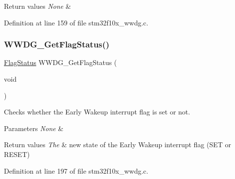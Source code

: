 \begin{DoxyRetVals}{Return values}
{\em None} & \\
\hline
\end{DoxyRetVals}


Definition at line 159 of file stm32f10x\+\_\+wwdg.\+c.

\mbox{\label{group___w_w_d_g___exported___functions_ga7df4882d45918b9b8249dfca1e44fabc}} 
\subsubsection{\texorpdfstring{W\+W\+D\+G\+\_\+\+Get\+Flag\+Status()}{WWDG\_GetFlagStatus()}}
{\footnotesize\ttfamily \hyperlink{group___exported__types_ga89136caac2e14c55151f527ac02daaff}{Flag\+Status} W\+W\+D\+G\+\_\+\+Get\+Flag\+Status (\begin{DoxyParamCaption}\item[{void}]{ }\end{DoxyParamCaption})}



Checks whether the Early Wakeup interrupt flag is set or not. 


\begin{DoxyParams}{Parameters}
{\em None} & \\
\hline
\end{DoxyParams}

\begin{DoxyRetVals}{Return values}
{\em The} & new state of the Early Wakeup interrupt flag (S\+ET or R\+E\+S\+ET) \\
\hline
\end{DoxyRetVals}


Definition at line 197 of file stm32f10x\+\_\+wwdg.\+c.

\mbox{\label{group___w_w_d_g___exported___functions_ga6e44cc35f133b28b9ad861f459bf8d76}} 
